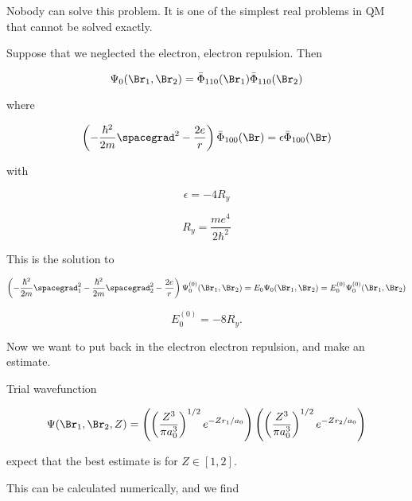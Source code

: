 Nobody can solve this problem.  It is one of the simplest real problems in QM that cannot be solved exactly.

Suppose that we neglected the electron, electron repulsion.  Then

\begin{equation}\label{eqn:qmTwoL2:530}
\Psi_0(\Br_1, \Br_2)
=
\bar{\Phi}_{110}(\Br_1)
\bar{\Phi}_{110}(\Br_2)
\end{equation}

where

\begin{equation}\label{eqn:qmTwoL2:550}
\left( -\frac{\hbar^2}{2 m} \spacegrad^2
- \frac{2 e}{r} \right)
\bar{\Phi}_{100}(\Br) = \epsilon \bar{\Phi}_{100}(\Br)
\end{equation}

with

\begin{equation}\label{eqn:qmTwoL2:570}
\epsilon = - 4 R_y
\end{equation}

\begin{equation}\label{eqn:qmTwoL2:590}
R_y = \frac{m e^4}{2 \hbar^2}
\end{equation}

This is the solution to

\begin{equation}\label{eqn:qmTwoL2:610}
\left(
-\frac{\hbar^2}{2 m} \spacegrad_1^2
-\frac{\hbar^2}{2 m} \spacegrad_2^2
- \frac{2 e}{r}
\right)
\Psi_0^{(0)}(\Br_1, \Br_2) = E_0 \Psi_0(\Br_1, \Br_2)
=
E_0^{(0)} \Psi_0^{(0)}(\Br_1, \Br_2)
\end{equation}

\begin{equation}\label{eqn:qmTwoL2:630}
E_0^{(0)} = - 8 R_y.
\end{equation}

Now we want to put back in the electron electron repulsion, and make an estimate.

Trial wavefunction

\begin{equation}\label{eqn:qmTwoL2:650}
\Psi(\Br_1, \Br_2, Z) =
\left(
\left(\frac{Z^3}{ \pi a_0^3 }\right)^{1/2} e^{-Z r_1/a_0}
\right)
\left(
\left(\frac{Z^3}{ \pi a_0^3 }\right)^{1/2} e^{-Z r_2/a_0}
\right)
\end{equation}

expect that the best estimate is for $Z \in [1,2]$.

This can be calculated numerically, and we find

